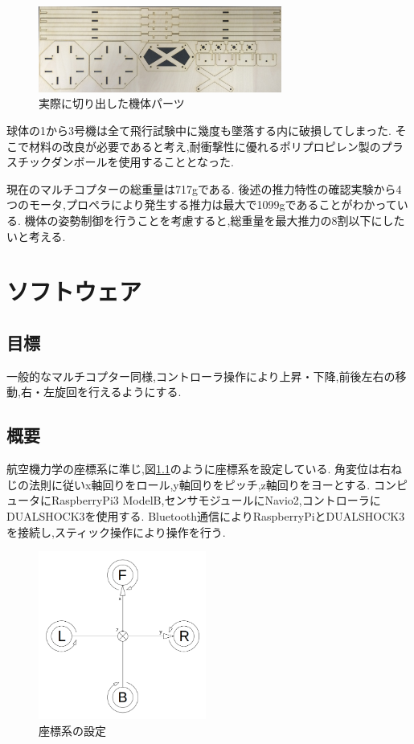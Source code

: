 \documentclass[12pt,oneside]{sotsuken_paper}
\begin{document}
\begin{figure}[htbp]
	\begin{center}
		\includegraphics[width=80mm]{image/drone/cut.jpg}
		\caption{実際に切り出した機体パーツ}
		\label{fig:cut}
	\end{center}
\end{figure}

球体の1から3号機は全て飛行試験中に幾度も墜落する内に破損してしまった.
そこで材料の改良が必要であると考え,耐衝撃性に優れるポリプロピレン製のプラスチックダンボールを使用することとなった.

現在のマルチコプターの総重量は717gである.
後述の推力特性の確認実験から4つのモータ,プロペラにより発生する推力は最大で1099gであることがわかっている.
機体の姿勢制御を行うことを考慮すると,総重量を最大推力の8割以下にしたいと考える. %


\chapter{ソフトウェア}

\section{目標}
一般的なマルチコプター同様,コントローラ操作により上昇・下降,前後左右の移動,右・左旋回を行えるようにする.

\section{概要}
航空機力学の座標系\cite{config}に準じ,図\ref{fig:config}のように座標系を設定している.
角変位は右ねじの法則に従いx軸回りをロール,y軸回りをピッチ,z軸回りをヨーとする.
コンピュータにRaspberryPi3 ModelB,センサモジュールにNavio2,コントローラにDUALSHOCK3を使用する.
Bluetooth通信によりRaspberryPiとDUALSHOCK3を接続し,スティック操作により操作を行う.

\begin{figure}[htbp]
	\begin{center}
		\includegraphics[width=55mm]{image/config.png}
		\caption{座標系の設定}
		\label{fig:config}
	\end{center}
\end{figure}
\end{document}
